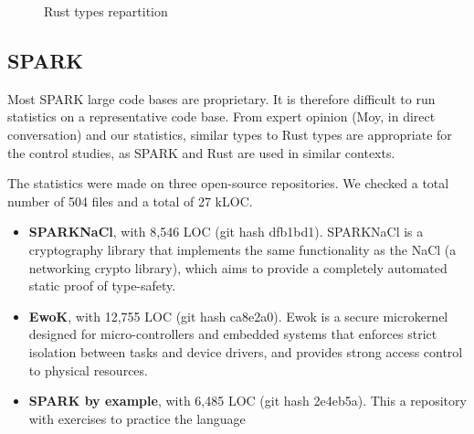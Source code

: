 \documentclass[nomenclature, english, bibtex]{kththesis}
\begin{document}
\begin{figure}[ht!]
  \centering
  \caption{Rust types repartition}
  \label{fig:repartitionrust}
\end{figure}
\FloatBarrier

\subsection{SPARK}

Most SPARK large code bases are proprietary. It is therefore difficult to run statistics on a representative code base. From expert opinion (Moy, in direct conversation) and our statistics, similar types to Rust types are appropriate for the control studies, as SPARK and Rust are used in similar contexts.

The statistics were made on three open-source repositories. 
We checked a total number of 504 files and a total of 27 k\gls{LOC}.

\begin{itemize}
    \item \textbf{SPARKNaCl}, with 8,546 \gls{LOC} (git hash dfb1bd1). SPARKNaCl is a cryptography library that implements the same functionality as the NaCl (a networking crypto library), which aims to provide a completely automated static proof of type-safety.
    \item \textbf{EwoK}, with 12,755 LOC (git hash ca8e2a0). Ewok is a secure microkernel designed for micro-controllers and embedded systems that enforces strict isolation between tasks and device drivers, and provides strong access control to physical resources.  
    \item \textbf{SPARK by example}, with 6,485 LOC (git hash 2e4eb5a). This a repository with exercises to practice the language
\end{itemize}
\end{document}

